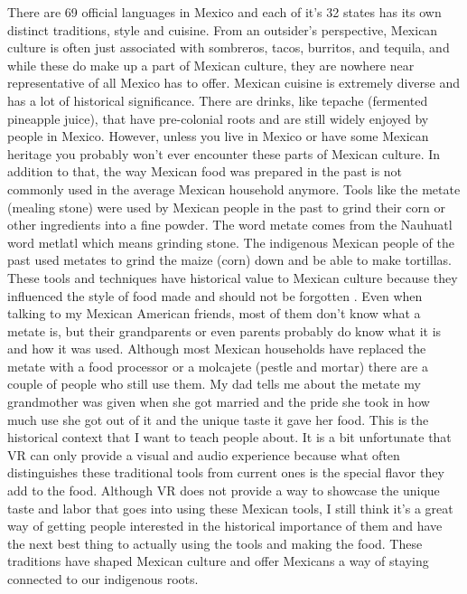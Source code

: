 \documentclass[12pt,twocolumn]{article}
\begin{document}
There are 69 official languages in Mexico and each of it’s 32 states has its own distinct traditions, style and cuisine. From an outsider’s perspective, Mexican culture is often just associated with sombreros, tacos, burritos, and tequila, and while these do make up a part of Mexican culture, they are nowhere near representative of all Mexico has to offer. Mexican cuisine is extremely diverse and has a lot of historical significance. There are drinks, like tepache (fermented pineapple juice), that have pre-colonial roots and are still widely enjoyed by people in Mexico. However, unless you live in Mexico or have some Mexican heritage you probably won’t ever encounter these parts of Mexican culture. In addition to that, the way Mexican food was prepared in the past is not commonly used in the average Mexican household anymore. Tools like the metate (mealing stone) were used by Mexican people in the past to grind their corn or other ingredients into a fine powder. The word metate comes from the Nauhuatl word metlatl which means grinding stone. The indigenous Mexican people of the past used metates to grind the maize (corn) down and be able to make tortillas. These tools and techniques have historical value to Mexican culture because they influenced the style of food made and should not be forgotten . Even when talking to my Mexican American friends, most of them don’t know what a metate is, but their grandparents or even parents probably do know what it is and how it was used. Although most Mexican households have replaced the metate with a food processor or a molcajete (pestle and mortar) there are a couple of people who still use them. My dad tells me about the metate my grandmother was given when she got married and the pride she took in how much use she got out of it and the unique taste it gave her food. This is the historical context that I want to teach people about. It is a bit unfortunate that VR can only provide a visual and audio experience because what often distinguishes these traditional tools from current ones is the special flavor they add to the food. Although VR does not provide a way to showcase the unique taste and labor that goes into using these Mexican tools, I still think it’s a great way of getting people interested in the historical importance of them and have the next best thing to actually using the tools and making the food. These traditions have shaped Mexican culture and offer Mexicans a way of staying connected to our indigenous roots. 
 
\end{document}
